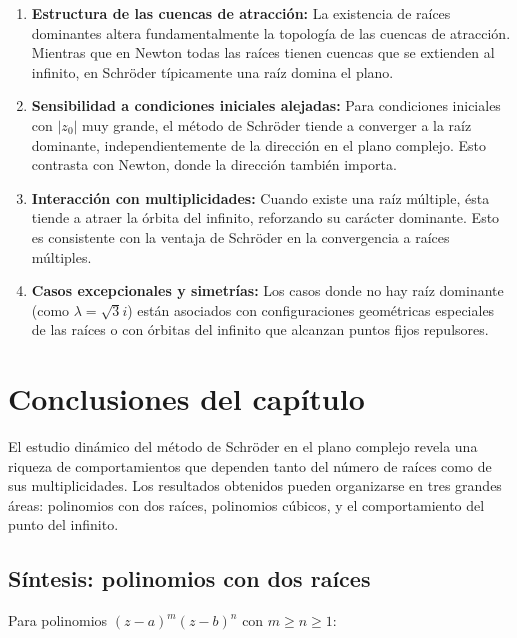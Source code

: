 \begin{enumerate}
\item \textbf{Estructura de las cuencas de atracción:} La existencia de raíces dominantes altera fundamentalmente la topología de las cuencas de atracción. Mientras que en Newton todas las raíces tienen cuencas que se extienden al infinito, en Schröder típicamente una raíz domina el plano.

\item \textbf{Sensibilidad a condiciones iniciales alejadas:} Para condiciones iniciales con $|z_0|$ muy grande, el método de Schröder tiende a converger a la raíz dominante, independientemente de la dirección en el plano complejo. Esto contrasta con Newton, donde la dirección también importa.

\item \textbf{Interacción con multiplicidades:} Cuando existe una raíz múltiple, ésta tiende a atraer la órbita del infinito, reforzando su carácter dominante. Esto es consistente con la ventaja de Schröder en la convergencia a raíces múltiples.

\item \textbf{Casos excepcionales y simetrías:} Los casos donde no hay raíz dominante (como $\lambda=\sqrt{3}i$) están asociados con configuraciones geométricas especiales de las raíces o con órbitas del infinito que alcanzan puntos fijos repulsores.
\end{enumerate}

\section{Conclusiones del capítulo}

El estudio dinámico del método de Schröder en el plano complejo revela una riqueza de comportamientos que dependen tanto del número de raíces como de sus multiplicidades. Los resultados obtenidos pueden organizarse en tres grandes áreas: polinomios con dos raíces, polinomios cúbicos, y el comportamiento del punto del infinito.

\subsection{Síntesis: polinomios con dos raíces}

Para polinomios $(z-a)^m(z-b)^n$ con $m\ge n\ge 1$:

